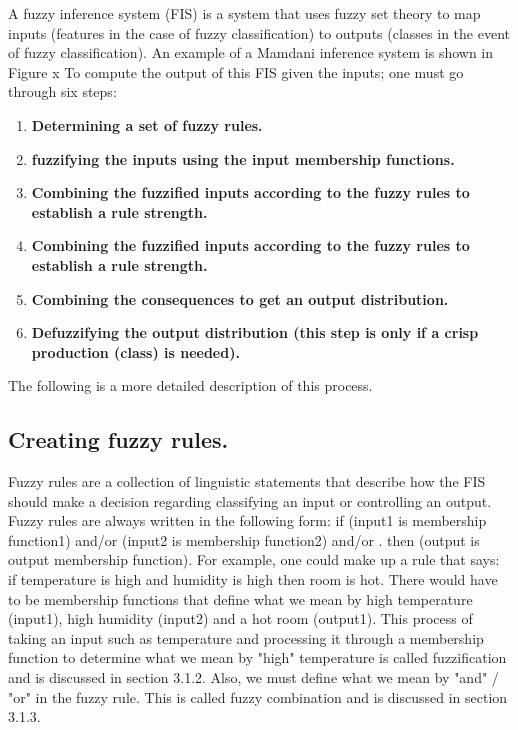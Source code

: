 A fuzzy inference system (FIS) is a system that uses fuzzy set theory to map
inputs (features in the case of fuzzy classification) to outputs (classes in the
event of fuzzy classification). An example of a Mamdani inference system is
shown in Figure x To compute the output of this FIS given the inputs; one must
go through six steps:

\begin{enumerate}
\item \textbf{Determining a set of fuzzy rules.}
\item \textbf{fuzzifying the inputs using the input membership functions.}
\item \textbf{Combining the fuzzified inputs according to the fuzzy rules to establish a rule strength.}
\item \textbf{Combining the fuzzified inputs according to the fuzzy rules to establish a rule strength.}
\item \textbf{Combining the consequences to get an output distribution.}
\item \textbf{Defuzzifying the output distribution (this step is only if a crisp production (class) is needed).}
\end{enumerate}

The following is a more detailed description of this process.

\subsection{Creating fuzzy rules.}

Fuzzy rules are a collection of linguistic
statements that describe how the FIS should make a decision regarding
classifying an input or controlling an output. Fuzzy rules are always written in
the following form: if (input1 is membership function1) and/or (input2 is
membership function2) and/or . then (output is output membership function). For
example, one could make up a rule that says: if temperature is high and humidity
is high then room is hot. There would have to be membership functions that
define what we mean by high temperature (input1), high humidity (input2) and a
hot room (output1). This process of taking an input such as temperature and
processing it through a membership function to determine what we mean by "high"
temperature is called fuzzification and is discussed in section 3.1.2. Also, we
must define what we mean by "and" / "or" in the fuzzy rule. This is called fuzzy
combination and is discussed in section 3.1.3.

